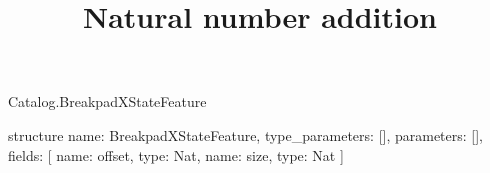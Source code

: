\begin{lexlean}{Catalog.BreakpadXStateFeature}
\title{Natural number addition}
\begin{semanticmodule}
structure{
  name: BreakpadXStateFeature,
  type_parameters: [],
  parameters: [],
  fields: [
    {name: offset, type: Nat},
    {name: size, type: Nat}
  ]
}
\end{semanticmodule}
\end{lexlean}

